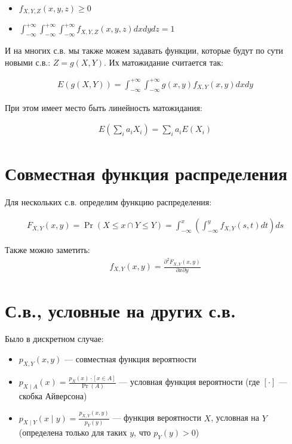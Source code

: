 \documentclass[12pt]{article}
\begin{document}
\begin{itemize}
  \item $f_{X, Y, Z}(x, y, z) \ge 0$
  \item $\int_{-\infty}^{+\infty} \int_{-\infty}^{+\infty} \int_{-\infty}^{+\infty} f_{X, Y, Z}(x, y, z)dx dy dz = 1$
\end{itemize}

И на многих с.в. мы также можем задавать функции, которые будут по сути новыми с.в.: $Z = g(X, Y)$. Их матожидание считается так:

\begin{align*}
  E(g(X, Y)) = \int_{-\infty}^{+\infty} \int_{-\infty}^{+\infty} g(x, y) f_{X, Y}(x, y) dx dy
\end{align*}

При этом имеет место быть линейность матожидания:

\begin{align*}
  E(\sum_i a_i X_i) = \sum_i a_i E(X_i)
\end{align*}

\section{Совместная функция распределения}

Для нескольких с.в. определим функцию распределения:

\begin{align*}
  F_{X, Y}(x, y) = \Pr(X \le x \cap Y \le Y) = \int_{-\infty}^{x} \left( \int_{-\infty}^{y} f_{X, Y}(s, t) dt \right) ds
\end{align*}

Также можно заметить:
\begin{align*}
  f_{X, Y}(x, y) = \frac{\partial^2F_{X, Y}(x, y)}{\partial x \partial y}
\end{align*}

\section{С.в., условные на других с.в.}

Было в дискретном случае:

\begin{itemize}
  \item $p_{X, Y}(x, y)$ --- совместная функция вероятности
  \item $p_{X \mid A}(x) = \frac{p_X(x)\cdot [x \in A]}{\Pr(A)}$ --- условная функция вероятности (где $[\cdot]$ --- скобка Айверсона)
  \item $p_{X \mid Y}(x \mid y) = \frac{p_{X, Y}(x, y)}{p_Y(y)}$ --- функция вероятности $X$, условная на $Y$ (определена только для таких $y$, что $p_Y(y) > 0$)
\end{itemize}
\end{document}
